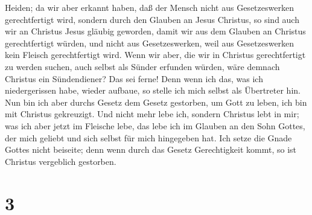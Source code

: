 Heiden;  da wir aber erkannt haben, daß der Mensch nicht
aus Gesetzeswerken gerechtfertigt wird, sondern durch den Glauben an
Jesus Christus, so sind auch wir an Christus Jesus gläubig geworden,
damit wir aus dem Glauben an Christus gerechtfertigt würden, und nicht
aus Gesetzeswerken, weil aus Gesetzeswerken kein Fleisch gerechtfertigt
wird.  Wenn wir aber, die wir in Christus gerechtfertigt
zu werden suchen, auch selbst als Sünder erfunden würden, wäre demnach
Christus ein Sündendiener? Das sei ferne!  Denn wenn ich
das, was ich niedergerissen habe, wieder aufbaue, so stelle ich mich
selbst als Übertreter hin.  Nun bin ich aber durchs
Gesetz dem Gesetz gestorben, um Gott zu leben, ich bin mit Christus
gekreuzigt.  Und nicht mehr lebe ich, sondern Christus
lebt in mir; was ich aber jetzt im Fleische lebe, das lebe ich im
Glauben an den Sohn Gottes, der mich geliebt und sich selbst für mich
hingegeben hat.  Ich setze die Gnade Gottes nicht
beiseite; denn wenn durch das Gesetz Gerechtigkeit kommt, so ist
Christus vergeblich gestorben.

\hypertarget{section-2}{%
\section{3}\label{section-2}}

